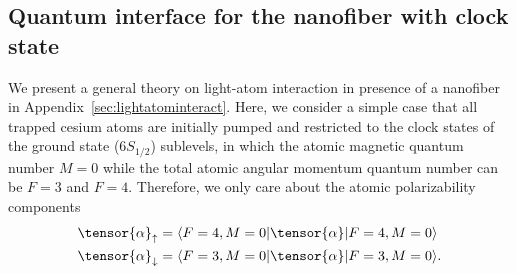 \documentclass[preprint,aps,pra,onecolumn]{revtex4-1} %
\begin{document}



\subsection{Quantum interface for the nanofiber with clock state}
We present a general theory on light-atom interaction in presence of a nanofiber in Appendix~\ref{sec:lightatominteract}. Here, we consider a simple case that all trapped cesium atoms are initially pumped and restricted to the clock states of the ground state ($6S_{1/2}$) sublevels, in which the atomic magnetic quantum number $M=0$ while the total atomic angular momentum quantum number can be $F=3$ and $F=4$. Therefore, we only care about the atomic polarizability components
\begin{align}
\tensor{\alpha}_{\uparrow} &=\bra{F=4,M=0}\tensor{\alpha}\ket{F=4,M=0}\\
\tensor{\alpha}_{\downarrow} &=\bra{F=3,M=0}\tensor{\alpha}\ket{F=3,M=0}.
\end{align}
\end{document}
